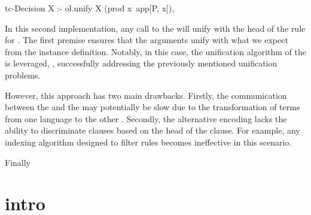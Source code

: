 \documentclass{rapport}
\begin{document}
\begin{center}
  \begin{minipage}[c]{0.46\linewidth}
    \begin{elpicode}
      tc-Decision X :- 
        ol.unify X (prod x\ app[P, x]),
    \end{elpicode}
  \end{minipage}
\end{center}

\noindent In this second implementation, any call to the 
will unify with the head of the rule for . The first
premise ensures that the arguments unify with what we expect from the
instance definition. Notably, in this case, the unification algorithm of
the \ol is leveraged, , successfully addressing the previously mentioned unification problems.

However, this approach has two main drawbacks. Firstly, the communication
between the \ol and the \ml may potentially be slow due to the transformation of
terms from one language to the other . Secondly, the alternative encoding lacks the ability to
discriminate clauses based on the head of the clause. For example, any indexing
algorithm designed to filter rules becomes ineffective in this scenario.

Finally 








  
\section{intro}
\end{document}
